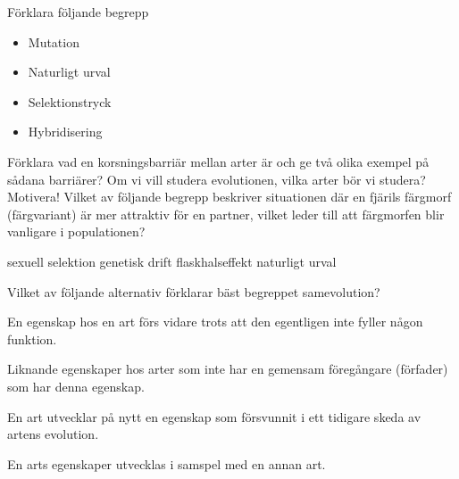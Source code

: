 \documentclass{exam}
\begin{document}
\vspace{5mm} %
\begin{center}
\end{center}
\vspace{5mm} %
\begin{questions}
\question Förklara följande begrepp

\begin{itemize}
  \item Mutation 
  \vspace{10mm}
  \item Naturligt urval
  \vspace{10mm}
  \item Selektionstryck
  \vspace{10mm}
  \item Hybridisering
\end{itemize}
\vspace{10mm} %
\question
Förklara vad en korsningsbarriär mellan arter är och ge två olika exempel på sådana barriärer?
\vspace{30mm} 
\question
Om vi vill studera evolutionen, vilka arter bör vi studera? Motivera!
\vspace{30mm} 
\question
Vilket av följande begrepp beskriver situationen där en fjärils färgmorf (färgvariant) är mer attraktiv för en partner, vilket leder till att färgmorfen blir vanligare i populationen?
\vspace{5mm}
\begin{checkboxes}
    \choice sexuell selektion
    \choice genetisk drift
    \choice flaskhalseffekt
    \choice naturligt urval
\end{checkboxes}
\break
\question 
Vilket av följande alternativ förklarar bäst begreppet samevolution?
\vspace{5mm}
\begin{checkboxes}
\choice En egenskap hos en art förs vidare trots att den egentligen inte fyller någon funktion.

\choice Liknande egenskaper hos arter som inte har en gemensam föregångare (förfader) som har denna egenskap.

\choice En art utvecklar på nytt en egenskap som försvunnit i ett tidigare skeda av artens evolution.

\choice En arts egenskaper utvecklas i samspel med en annan art.
\end{checkboxes}


\end{questions}
\end{document}
